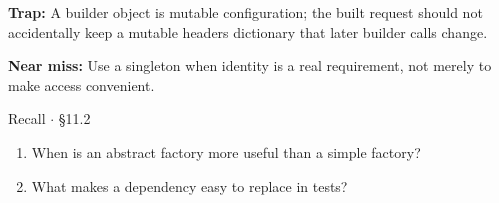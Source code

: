 \documentclass[11pt]{article}
\begin{document}
\begin{keepsection}
\begin{notebox}\textbf{Trap:} A builder object is mutable configuration; the built request should not accidentally keep a mutable headers dictionary that later builder calls change.\end{notebox}

\begin{notebox}\textbf{Near miss:} Use a singleton when identity is a real requirement, not merely to make access convenient.\end{notebox}

\begin{recallbox}{Recall \ensuremath{\cdot} §11.2}
\begin{enumerate}
\item When is an abstract factory more useful than a simple factory?
\item What makes a dependency easy to replace in tests?
\end{enumerate}

\end{recallbox}
\end{keepsection}
\end{document}
